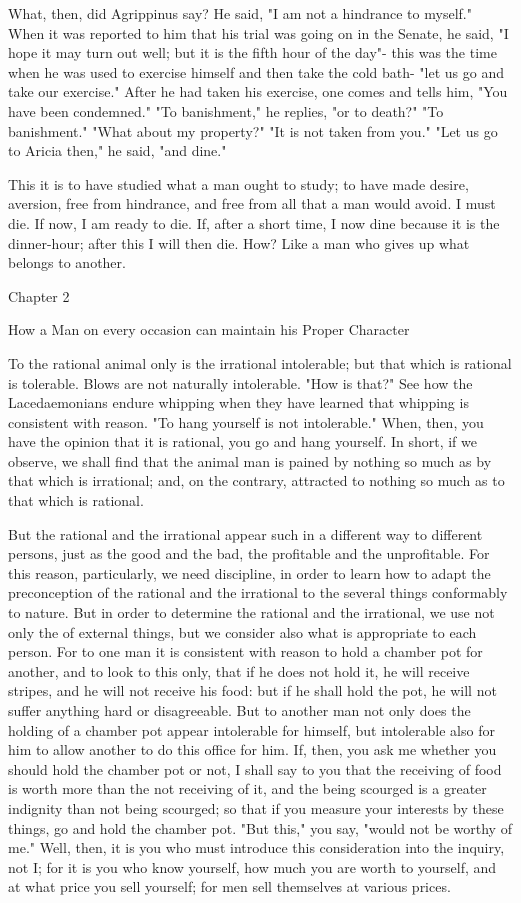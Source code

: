 \documentclass[a4paper]{article}
\begin{document}
What, then, did Agrippinus say? He said, "I am not a hindrance to
myself." When it was reported to him that his trial was going on in
the Senate, he said, "I hope it may turn out well; but it is the fifth
hour of the day"- this was the time when he was used to exercise himself
and then take the cold bath- "let us go and take our exercise." After
he had taken his exercise, one comes and tells him, "You have been
condemned." "To banishment," he replies, "or to death?" "To banishment."
"What about my property?" "It is not taken from you." "Let us go to
Aricia then," he said, "and dine." 

This it is to have studied what a man ought to study; to have made
desire, aversion, free from hindrance, and free from all that a man
would avoid. I must die. If now, I am ready to die. If, after a short
time, I now dine because it is the dinner-hour; after this I will
then die. How? Like a man who gives up what belongs to another.

Chapter 2

How a Man on every occasion can maintain his Proper Character

To the rational animal only is the irrational intolerable; but that
which is rational is tolerable. Blows are not naturally intolerable.
"How is that?" See how the Lacedaemonians endure whipping when they
have learned that whipping is consistent with reason. "To hang yourself
is not intolerable." When, then, you have the opinion that it is rational,
you go and hang yourself. In short, if we observe, we shall find that
the animal man is pained by nothing so much as by that which is irrational;
and, on the contrary, attracted to nothing so much as to that which
is rational. 

But the rational and the irrational appear such in a different way
to different persons, just as the good and the bad, the profitable
and the unprofitable. For this reason, particularly, we need discipline,
in order to learn how to adapt the preconception of the rational and
the irrational to the several things conformably to nature. But in
order to determine the rational and the irrational, we use not only
the of external things, but we consider also what is appropriate to
each person. For to one man it is consistent with reason to hold a
chamber pot for another, and to look to this only, that if he does
not hold it, he will receive stripes, and he will not receive his
food: but if he shall hold the pot, he will not suffer anything hard
or disagreeable. But to another man not only does the holding of a
chamber pot appear intolerable for himself, but intolerable also for
him to allow another to do this office for him. If, then, you ask
me whether you should hold the chamber pot or not, I shall say to
you that the receiving of food is worth more than the not receiving
of it, and the being scourged is a greater indignity than not being
scourged; so that if you measure your interests by these things, go
and hold the chamber pot. "But this," you say, "would not be worthy
of me." Well, then, it is you who must introduce this consideration
into the inquiry, not I; for it is you who know yourself, how much
you are worth to yourself, and at what price you sell yourself; for
men sell themselves at various prices. 
\end{document}
